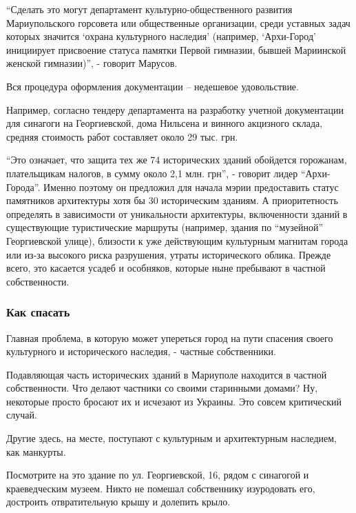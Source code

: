 \enquote{Сделать это могут департамент культурно-общественного развития Мариупольского
горсовета или общественные организации, среди уставных задач которых значится
\enquote{охрана культурного наследия} (например, \enquote{Архи-Город} инициирует присвоение
статуса памятки Первой гимназии, бывшей Мариинской женской гимназии)}, -
говорит  Марусов.

Вся процедура оформления документации – недешевое удовольствие. 

Например, согласно тендеру департамента на разработку учетной документации для
синагоги на Георгиевской, дома Нильсена и винного акцизного склада, средняя
стоимость работ составляет около 29 тыс. грн. 

\enquote{Это означает, что защита тех же 74 исторических зданий обойдется горожанам,
плательщикам налогов, в сумму около 2,1 млн. грн}, - говорит лидер
\enquote{Архи-Города}. Именно поэтому он предложил для начала мэрии предоставить статус
памятников архитектуры хотя бы 30 историческим зданиям. А приоритетность
определять в зависимости от  уникальности архитектуры, включенности зданий в
существующие туристические маршруты (например, здания по \enquote{музейной}
Георгиевской улице), близости к уже действующим культурным магнитам города  или
из-за высокого риска разрушения,  утраты исторического облика. Прежде всего,
это касается усадеб и особняков, которые ныне пребывают в частной
собственности.

\subsubsection{Как спасать}

Главная проблема, в которую может упереться город на пути спасения своего
культурного и исторического наследия,   - частные собственники.

Подавляющая часть исторических зданий в Мариуполе находится в частной
собственности. Что делают частники со своими старинными домами? Ну, некоторые
просто бросают их и исчезают из Украины. Это совсем критический случай.


Другие здесь, на месте, поступают с культурным и архитектурным наследием, как
манкурты.

Посмотрите на это здание по ул. Георгиевской, 16, рядом с синагогой и
краеведческим музеем. Никто не помешал собственнику изуродовать его, достроить
отвратительную крышу и долепить крыло.

